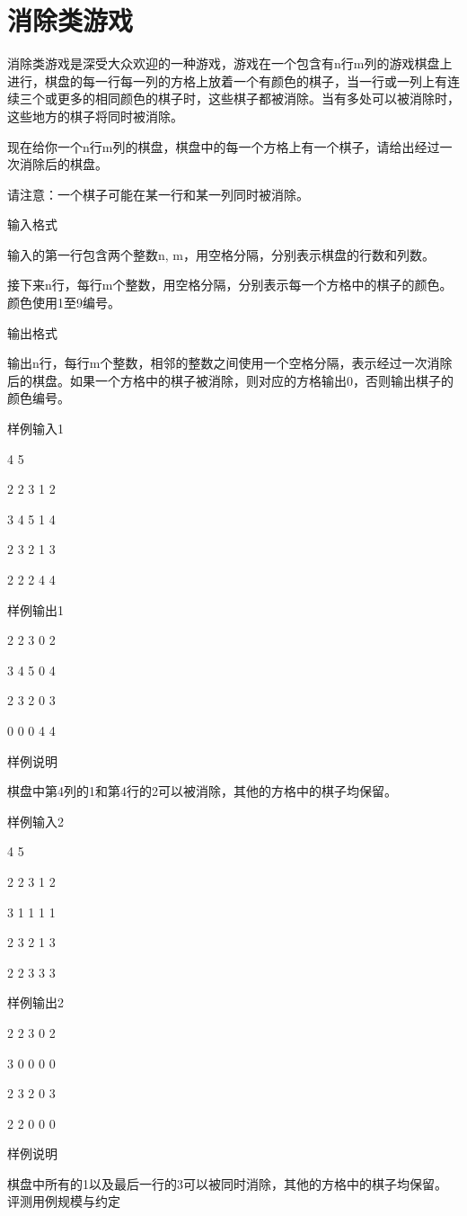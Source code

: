 \section{消除类游戏}
消除类游戏是深受大众欢迎的一种游戏，游戏在一个包含有n行m列的游戏棋盘上进行，棋盘的每一行每一列的方格上放着一个有颜色的棋子，当一行或一列上有连续三个或更多的相同颜色的棋子时，这些棋子都被消除。当有多处可以被消除时，这些地方的棋子将同时被消除。

现在给你一个n行m列的棋盘，棋盘中的每一个方格上有一个棋子，请给出经过一次消除后的棋盘。

请注意：一个棋子可能在某一行和某一列同时被消除。

输入格式

输入的第一行包含两个整数n, m，用空格分隔，分别表示棋盘的行数和列数。

接下来n行，每行m个整数，用空格分隔，分别表示每一个方格中的棋子的颜色。颜色使用1至9编号。

输出格式

输出n行，每行m个整数，相邻的整数之间使用一个空格分隔，表示经过一次消除后的棋盘。如果一个方格中的棋子被消除，则对应的方格输出0，否则输出棋子的颜色编号。

样例输入1

4 5

2 2 3 1 2

3 4 5 1 4

2 3 2 1 3

2 2 2 4 4

样例输出1

2 2 3 0 2

3 4 5 0 4

2 3 2 0 3

0 0 0 4 4

样例说明

棋盘中第4列的1和第4行的2可以被消除，其他的方格中的棋子均保留。

样例输入2

4 5

2 2 3 1 2

3 1 1 1 1

2 3 2 1 3

2 2 3 3 3

样例输出2

2 2 3 0 2

3 0 0 0 0

2 3 2 0 3

2 2 0 0 0

样例说明

棋盘中所有的1以及最后一行的3可以被同时消除，其他的方格中的棋子均保留。
评测用例规模与约定

